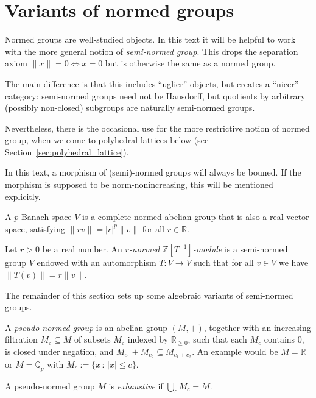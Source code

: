 \section{Variants of normed groups}
\label{sec:normed_groups}

\begin{remark}
  Normed groups are well-studied objects.
  In this text it will be helpful to work with
  the more general notion of \emph{semi-normed group}.
  This drops the separation axiom $\|x\| = 0 \iff x = 0$
  but is otherwise the same as a normed group.

  The main difference is that this includes ``uglier'' objects,
  but creates a ``nicer'' category:
  semi-normed groups need not be Hausdorff,
  but quotients by arbitrary (possibly non-closed) subgroups
  are naturally semi-normed groups.

  Nevertheless, there is the occasional use for the more restrictive
  notion of normed group, when we come to polyhedral lattices below
  (see Section~\ref{sec:polyhedral_lattice}).

  In this text, a morphism of (semi)-normed groups will always be bouned.
  If the morphism is supposed to be norm-nonincreasing,
  this will be mentioned explicitly.
\end{remark}

\begin{definition}
  \label{p-banach}
  \leanok
  A $p$-Banach space $V$ is a complete normed abelian group
  that is also a real vector space,
  satisfying $\|rv\| = |r|^p\|v\|$ for all $r \in \mathbb R$.
\end{definition}

\begin{definition}
  \label{normed_with_aut}
  \leanok
  Let $r > 0$ be a real number.
  An \emph{$r$-normed $\mathbb Z[T^{\pm 1}]$-module}
  is a semi-normed group $V$
  endowed with an automorphism $T \colon V \to V$ such that
  for all $v \in V$ we have $\|T(v)\| = r\|v\|$.
\end{definition}

The remainder of this section sets up some algebraic variants of semi-normed groups.

\begin{definition}
  \label{pseudo_normed_group}
  \leanok
  A \emph{pseudo-normed group} is an abelian group $(M,+)$,
  together with an increasing filtration $M_c \subseteq M$ of subsets $M_c$ indexed by $\mathbb R_{\ge 0}$,
  such that each $M_c$ contains $0$, is closed under negation,
  and $M_{c_1} + M_{c_2} \subseteq M_{c_1 + c_2}$. An example would be $M=\mathbb{R}$ or $M=\mathbb{Q}_p$ with $M_c :=\{x\,:\,|x|\leq c\}$.

  A pseudo-normed group $M$ is \emph{exhaustive} if $\bigcup_c M_c = M$.
\end{definition}

